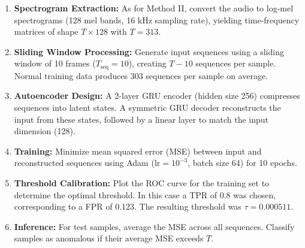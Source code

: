 \documentclass[ngerman]{scrartcl}
\begin{document}
\begin{enumerate}
  \item \textbf{Spectrogram Extraction:} As for Method II, convert the audio to log-mel spectrograms (128 mel bands, 16 kHz sampling rate), yielding time-frequency matrices of shape \(T \times 128\) with \(T=313\).
  \item \textbf{Sliding Window Processing:} Generate input sequences using a sliding window of 10 frames (\(T_{\text{seq}} = 10\)), creating \(T - 10\) sequences per sample. Normal training data produces \(303\) sequences per sample on average.
  \item \textbf{Autoencoder Design:} A 2-layer GRU encoder (hidden size 256) compresses sequences into latent states. A symmetric GRU decoder reconstructs the input from these states, followed by a linear layer to match the input dimension (128).
  \item \textbf{Training:} Minimize mean squared error (MSE) between input and reconstructed sequences using Adam (\(\text{lr} = 10^{-3}\), batch size 64) for 10 epochs.
  \item \textbf{Threshold Calibration:} Plot the ROC curve for the training set to determine the optimal threshold. In this case a TPR of 0.8 was chosen, corresponding to a FPR of 0.123. The resulting threshold was \(\tau = 0.000511\).
  \item \textbf{Inference:} For test samples, average the MSE across all sequences. Classify samples as anomalous if their average MSE exceeds \(T\).
\end{enumerate}
\end{document}

